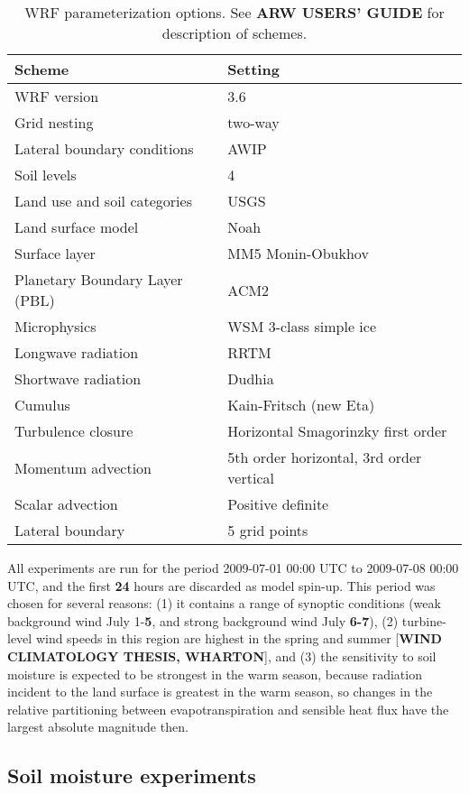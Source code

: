 \begin{table}
\begin{tabular}{l l}
\hline
Scheme & Setting \\ \hline
WRF version & 3.6 \\
Grid nesting & two-way \\
Lateral boundary conditions & AWIP \\
Soil levels & 4 \\
Land use and soil categories & USGS \\
Land surface model & Noah \\
Surface layer & MM5 Monin-Obukhov \\
Planetary Boundary Layer (PBL) & ACM2 \\
Microphysics & WSM 3-class simple ice \\
Longwave radiation & RRTM \\
Shortwave radiation & Dudhia \\
Cumulus & Kain-Fritsch (new Eta) \\
Turbulence closure & Horizontal Smagorinzky first order \\
Momentum advection & 5th order horizontal, 3rd order vertical \\
Scalar advection & Positive definite \\
Lateral boundary & 5 grid points \\
\hline
\end{tabular}
\caption{WRF parameterization options.  See \textbf{ARW USERS' GUIDE} for description of schemes.}
\label{table:windSol_paramschemes}
\end{table}

All experiments are run for the period 2009-07-01 00:00 UTC to 2009-07-08 00:00 UTC, and the first \textbf{24} hours are discarded as model spin-up.  This period was chosen for several reasons: (1) it contains a range of synoptic conditions (weak background wind July 1-\textbf{5}, and strong background wind July \textbf{6-7}), (2) turbine-level wind speeds in this region are highest in the spring and summer [\textbf{WIND CLIMATOLOGY THESIS, WHARTON}], and (3) the sensitivity to soil moisture is expected to be strongest in the warm season, because radiation incident to the land surface is greatest in the warm season, so changes in the relative partitioning between evapotranspiration and sensible heat flux have the largest absolute magnitude then.

\subsection{Soil moisture experiments}


